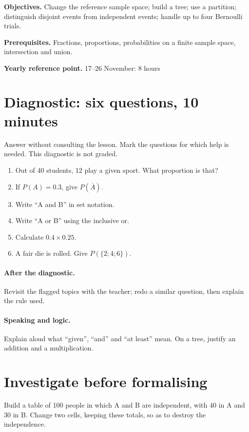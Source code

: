 \label{C05}
\begin{keypoint}
\textbf{Objectives.} Change the reference sample space; build a tree; use a partition; distinguish disjoint events from independent events; handle up to four Bernoulli trials.

\textbf{Prerequisites.} Fractions, proportions, probabilities on a finite sample space, intersection and union.

\textbf{Yearly reference point.} 17--26 November: 8 hours\end{keypoint}
\section*{Diagnostic: six questions, 10 minutes}\label{C05-D}
Answer without consulting the lesson. Mark the questions for which help is needed. This diagnostic is not graded.
\begin{enumerate}
\item Out of 40 students, 12 play a given sport. What proportion is that?
\item If $P(A)=0.3$, give $P(\overline A)$.
\item Write ``A and B'' in set notation.
\item Write ``A or B'' using the inclusive or.
\item Calculate $0.4\times0.25$.
\item A fair die is rolled. Give $P(\{2;4;6\})$.
\end{enumerate}
\paragraph{After the diagnostic.} Revisit the flagged topics with the teacher; redo a similar question, then explain the rule used.
\paragraph{Speaking and logic.} Explain aloud what ``given'', ``and'' and ``at least'' mean. On a tree, justify an addition and a multiplication.
\mxnewpage
\section*{Investigate before formalising}\label{C05-RECH}
Build a table of 100 people in which A and B are independent, with 40 in A and 30 in B. Change two cells, keeping these totals, so as to destroy the independence.
